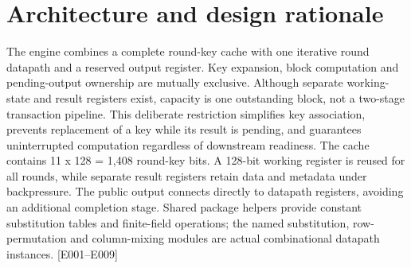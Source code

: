 \documentclass[11pt,a4paper]{article}
\begin{document}
\renewcommand{\abstractname}{\textcolor{vulcanblue}{Abstract}}\begin{abstract}\noindent RIVET-A1 implements a fixed-width AES-128 block engine for integration into a synchronous digital system. It supports encryption and decryption,\allowbreak{} caches all eleven round keys,\allowbreak{} preserves an opaque transaction tag,\allowbreak{} and provides independent valid/\allowbreak{}ready key,\allowbreak{} block-input and block-output channels. A shared 128-bit datapath performs initial AddRoundKey at block acceptance followed by exactly ten computational clock edges. Independent Icarus Verilog simulation checked the official FIPS 197 Appendix B and C.1 vectors in both directions,\allowbreak{} directed protocol boundaries,\allowbreak{} and three reproducible randomized scenarios. The baseline retired 217 checked results; two additional accepted blocks were intentionally canceled by reset. All five compiling functional mutations were detected. Generic Yosys synthesis retained 1,\allowbreak{}830 sequential bits and inferred zero latch cells. These results establish the delivered functional RTL scope,\allowbreak{} not physical timing closure or silicon security certification. [\allowbreak{}E010,\allowbreak{} E015]\allowbreak{}\par{}\end{abstract}\vspace{2pt}

\section{Architecture and design rationale}

The engine combines a complete round-key cache with one iterative round datapath and a reserved output register. Key expansion,\allowbreak{} block computation and pending-output ownership are mutually exclusive. Although separate working-state and result registers exist,\allowbreak{} capacity is one outstanding block,\allowbreak{} not a two-stage transaction pipeline. This deliberate restriction simplifies key association,\allowbreak{} prevents replacement of a key while its result is pending,\allowbreak{} and guarantees uninterrupted computation regardless of downstream readiness. The cache contains 11 x 128 =\allowbreak{} 1,\allowbreak{}408 round-key bits. A 128-bit working register is reused for all rounds,\allowbreak{} while separate result registers retain data and metadata under backpressure. The public output connects directly to datapath registers,\allowbreak{} avoiding an additional completion stage. Shared package helpers provide constant substitution tables and finite-field operations; the named substitution,\allowbreak{} row-permutation and column-mixing modules are actual combinational datapath instances. [\allowbreak{}E001–E009]\allowbreak{}
\end{document}
